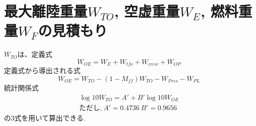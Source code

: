 \documentclass[../main]{subfiles}
\begin{document}
\section{最大離陸重量$W_{TO}$, 空虚重量$W_{E}$, 燃料重量$W_F$の見積もり }
  $W_{TO}$は、定義式
  \begin{equation}
    W_{OE} = W_{E} + W_{tfo} + W_{crew} + W_{OP}
    \label{eq:w_oe1}
  \end{equation}
  定義式から導出される式
  \begin{equation}
    W_{OE} = W_{TO} - (1-M_{ff})W_{TO} - W_{Fres} - W_{PL}
    \label{eq:w_oe2}
  \end{equation}
  統計関係式
  \begin{align}
    \log{10} W_{TO} = A' + B'\log{10}W_{OE} \label{log10} \\
    \text{ただし,} \ A'=0.4736 \  B'=0.9656 \label{eq:ab}
  \end{align}
  の3式を用いて算出できる.
\end{document}
